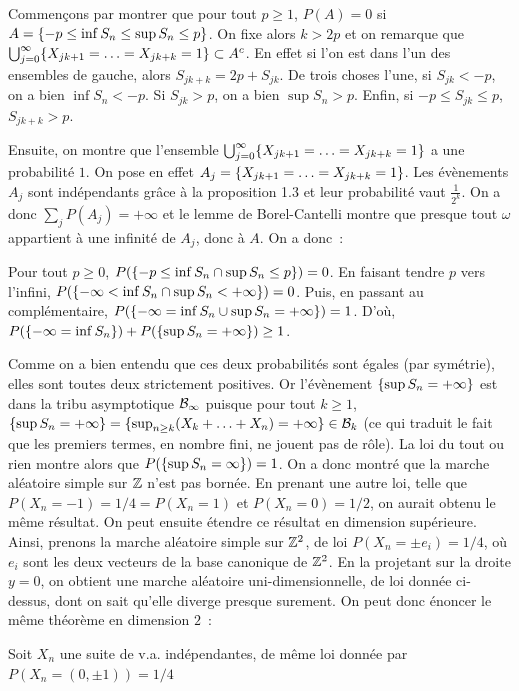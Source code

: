 \dem Commençons par montrer que pour tout $p\geq 1$, $P(A)=0$ si 
$A = \{-p\leq\inf S_n\leq\sup S_n\leq p\}$.
On fixe alors $k> 2p$ et on remarque que $\bigcup_{j=0}^{\infty}\{X_{jk+1}=\ldots=X_{jk+k}=1\}
\subset A^c$. En effet si l'on est dans l'un des ensembles de gauche, alors 
$S_{jk+k} = 2p + S_{jk}$. De trois choses l'une, si $S_{jk} <-p$, on a bien $\inf S_n <-p$.
Si $S_{jk} > p$, on a bien $\sup S_n>p$. Enfin, si $-p\leq S_{jk}\leq p$, $S_{jk+k}> p$.\par
Ensuite, on montre que l'ensemble $\bigcup_{j=0}^{\infty}\{X_{jk+1}=\ldots=X_{jk+k}=1\}$
a une probabilité $1$. On pose en effet $A_j = \{X_{jk+1}=\ldots=X_{jk+k}=1\}$. Les évènements
$A_j$ sont indépendants grâce à la proposition 1.3 et leur probabilité vaut $\frac{1}{2^k}$.
On a donc $\sum_j P(A_j) = +\infty$ et le lemme de Borel-Cantelli montre que presque tout $\omega$
appartient à une infinité de $A_j$, donc à $A$. On a donc~:\par
Pour tout $p\geq 0$, $P(\{-p\leq\inf S_n\cap\sup S_n\leq p\}) = 0$.
En faisant tendre $p$ vers l'infini, $P(\{-\infty<\inf S_n\cap\sup S_n<+\infty\}) = 0$.
Puis, en passant au complémentaire, $P(\{-\infty=\inf S_n\cup\sup S_n=+\infty\}) = 1$.
D'o\`u, $P(\{-\infty=\inf S_n\})+P(\{\sup S_n=+\infty\}) \geq 1$.\par
Comme on a bien entendu que ces deux probabilités sont égales (par symétrie), elles sont
toutes deux strictement positives. Or l'évènement $\{\sup S_n = +\infty\}$ est dans la tribu
asymptotique $\mathcal{B}_{\infty}$ puisque pour tout $k\geq 1$, $\{\sup S_n = +\infty\} = 
\{\sup_{n\geq k}(X_k +\ldots + X_n) = +\infty\}\in \mathcal{B}_k$ (ce qui traduit le fait que les 
premiers termes, en nombre fini, ne jouent pas de rôle). La loi du tout ou rien montre alors que 
$P(\{\sup S_n = \infty\}) = 1$.\findem
On a donc montré que la marche aléatoire simple sur $\mathbb{Z}$ n'est pas bornée. En prenant une autre
loi, telle que $P(X_n=-1) = 1/4 = P(X_n = 1)$ et $P(X_n=0) = 1/2$, on aurait obtenu le même 
résultat. On peut ensuite étendre ce résultat en dimension supérieure. Ainsi, prenons la marche 
aléatoire simple sur ${\mathbb{Z}}^2$, de loi $P(X_n = \pm e_i)=1/4$, o\`u $e_i$ sont les deux vecteurs de 
la base canonique de ${\mathbb{Z}}^2$. En la projetant sur la droite $y=0$, on obtient une marche aléatoire
uni-dimensionnelle, de loi donnée ci-dessus, dont on sait qu'elle diverge presque surement. On peut 
donc énoncer le même théorème en dimension $2$~:\par
\theoreme{} Soit $X_n$ une suite de v.a. indépendantes, de même loi donnée par $P(X_n=(0,\pm1))=1/4$
